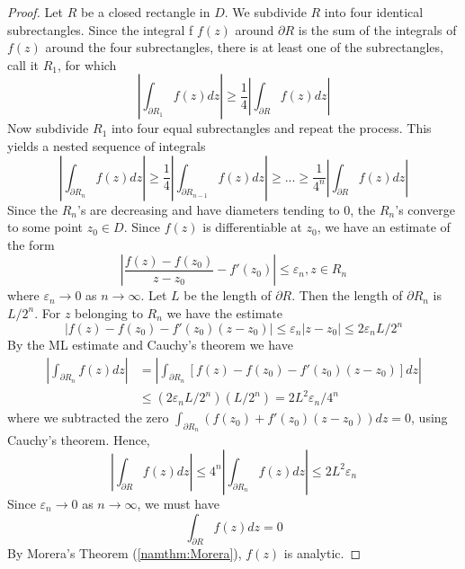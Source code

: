 \begin{proof}
    Let $R$ be a closed rectangle in $D$. We subdivide $R$ into four identical subrectangles. Since the integral f $f(z)$ around $\partial R$ is the sum of the integrals of $f(z)$ around the four subrectangles, there is at least one of the subrectangles, call it $R_1$, for which \begin{equation*}
        \left|\int_{\partial R_1}f(z)dz\right| \geq \frac{1}{4}\left|\int_{\partial R}f(z)dz\right|
    \end{equation*}
    Now subdivide $R_1$ into four equal subrectangles and repeat the process. This yields a nested sequence of integrals \begin{equation*}
        \left|\int_{\partial R_n}f(z)dz\right| \geq \frac{1}{4}\left|\int_{\partial R_{n-1}}f(z)dz\right| \geq ... \geq \frac{1}{4^n}\left|\int_{\partial R}f(z)dz\right|
    \end{equation*}
    Since the $R_n$'s are decreasing and have diameters tending to $0$, the $R_n$'s converge to some point $z_0 \in D$. Since $f(z)$ is differentiable at $z_0$, we have an estimate of the form \begin{equation*}
        \left|\frac{f(z)-f(z_0)}{z-z_0} - f'(z_0)\right| \leq \varepsilon_n, z \in R_n
    \end{equation*}
    where $\varepsilon_n\rightarrow 0$ as $n\rightarrow \infty$. Let $L$ be the length of $\partial R$. Then the length of $\partial R_n$ is $L/2^n$. For $z$ belonging to $R_n$ we have the estimate \begin{equation*}
        |f(z) - f(z_0) - f'(z_0)(z-z_0)| \leq \varepsilon_n|z-z_0| \leq 2\varepsilon_nL/2^n
    \end{equation*}
    By the ML estimate and Cauchy's theorem we have \begin{align*}
        \left|\int_{\partial R_n}f(z)dz\right| &= \left|\int_{\partial R_n}[f(z)-f(z_0)-f'(z_0)(z-z_0)]dz\right| \\
        &\leq (2\varepsilon_nL/2^n)(L/2^n) = 2L^2\varepsilon_n/4^n
    \end{align*}
    where we subtracted the zero $\int_{\partial R_n}(f(z_0)+f'(z_0)(z-z_0))dz =0$, using Cauchy's theorem. Hence, \begin{equation*}
        \left|\int_{\partial R}f(z)dz\right| \leq 4^n\left|\int_{\partial R_n}f(z)dz\right| \leq 2L^2\varepsilon_n
    \end{equation*}
    Since $\varepsilon_n\rightarrow 0$ as $n\rightarrow \infty$, we must have \begin{equation*}
        \int_{\partial R}f(z)dz = 0
    \end{equation*}
    By Morera's Theorem (\ref{namthm:Morera}), $f(z)$ is analytic.
\end{proof}



